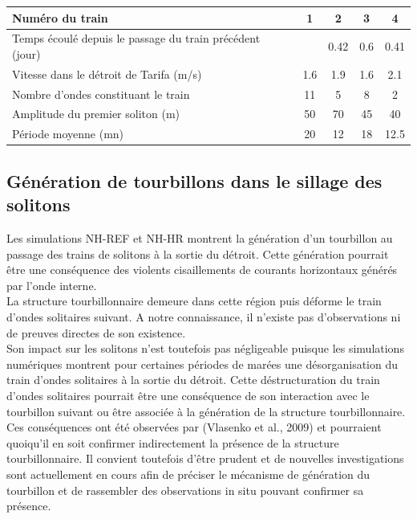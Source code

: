 \documentclass[a4paper,11pt]{report}
\begin{document}
\begin{table}[!h]
	\centering
	\begin{tabular}{|l|c|c|c|c|}
		\hline
		Numéro du train &  1 & 2 & 3 & 4  \\
		\hline
		Temps écoulé depuis le passage du train précédent (jour) & & 0.42 &0.6 & 0.41\\
		Vitesse dans le détroit de Tarifa (m/s) & 1.6 & 1.9 & 1.6 & 2.1\\
		Nombre d'ondes constituant le train & 11 & 5 & 8 & 2 \\
		Amplitude du premier soliton (m) & 50 &70 &45 &40\\
		Période moyenne (mn) & 20 & 12 & 18 & 12.5\\
		\hline
	\end{tabular}
	\label{tab_XEC}
\end{table}

\subsection{Génération de tourbillons dans le sillage des solitons}

Les simulations NH-REF et NH-HR montrent la génération d'un tourbillon au passage des trains de solitons à la sortie du détroit. Cette génération pourrait être une conséquence des violents cisaillements de courants horizontaux générés par l'onde interne.\\
La structure tourbillonnaire demeure dans cette région puis déforme le train d'ondes solitaires suivant. A notre connaissance, il n'existe pas d'observations ni de preuves directes de son existence.\\
Son impact sur les solitons n'est toutefois pas négligeable puisque les simulations numériques montrent pour certaines périodes de marées une désorganisation du train d'ondes solitaires à la sortie du détroit. Cette déstructuration du train d'ondes solitaires pourrait être une conséquence de son interaction avec le tourbillon suivant ou être associée à la génération de la structure tourbillonnaire. Ces conséquences ont été observées par (Vlasenko et al., 2009) et pourraient quoiqu'il en soit confirmer indirectement la présence de la structure tourbillonnaire. Il convient toutefois d'être prudent et de nouvelles investigations sont actuellement en cours afin de préciser le mécanisme de génération du tourbillon et de rassembler des observations in situ pouvant confirmer sa présence.
\end{document}
